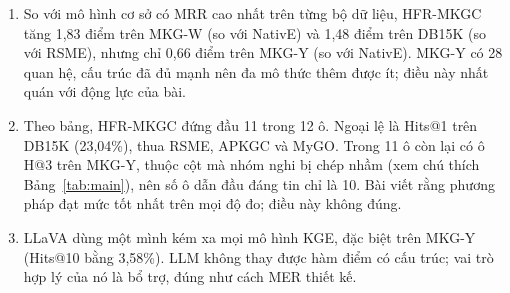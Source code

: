 \documentclass[conference,a4paper]{IEEEtran}
\begin{document}
\begin{enumerate}
\item So với mô hình cơ sở có MRR cao nhất trên từng bộ dữ liệu, HFR-MKGC tăng 1{,}83 điểm trên MKG-W (so với NativE) và 1{,}48 điểm trên DB15K (so với RSME), nhưng chỉ 0{,}66 điểm trên MKG-Y (so với NativE). MKG-Y có 28 quan hệ, cấu trúc đã đủ mạnh nên đa mô thức thêm được ít; điều này nhất quán với động lực của bài.
\item Theo bảng, HFR-MKGC đứng đầu 11 trong 12 ô. Ngoại lệ là Hits@1 trên DB15K (23{,}04\%), thua RSME, APKGC và MyGO. Trong 11 ô còn lại có ô H@3 trên MKG-Y, thuộc cột mà nhóm nghi bị chép nhầm (xem chú thích Bảng~\ref{tab:main}), nên số ô dẫn đầu đáng tin chỉ là 10. Bài viết rằng phương pháp đạt mức tốt nhất trên mọi độ đo; điều này không đúng.
\item LLaVA dùng một mình kém xa mọi mô hình KGE, đặc biệt trên MKG-Y (Hits@10 bằng 3{,}58\%). LLM không thay được hàm điểm có cấu trúc; vai trò hợp lý của nó là bổ trợ, đúng như cách MER thiết kế.
\end{enumerate}
\end{document}

